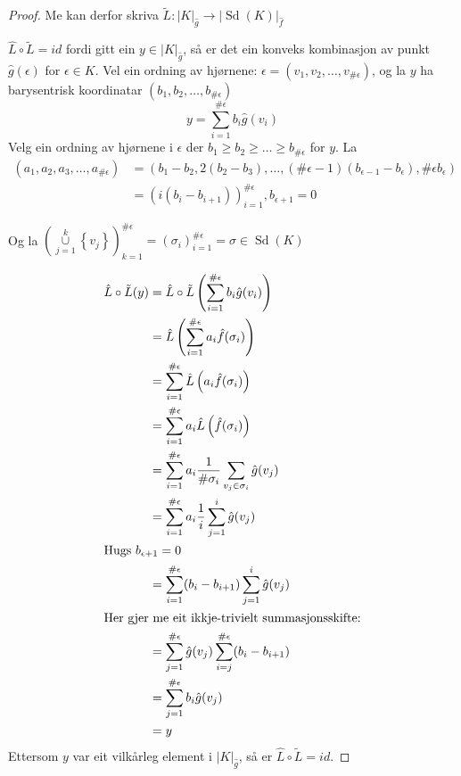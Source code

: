 \documentclass[a4paper, titlepage, 12pt, norsk]{article}
\theoremstyle{plain}
\theoremstyle{definition}
\newcommand{\union}{ \mathop{\cup}\limits }
\newcommand{\gr}[1]{ \lvert #1 \rvert } %
\newcommand{\set}[1]{ \left \{ #1 \right \} } %
\newcommand{\tuple}[1]{ \left( #1 \right) } %
\DeclareMathOperator{\Sd}{Sd}
\begin{document}
\begin{proof}
	Me kan derfor skriva \( \tilde{L}: \gr{K}_{\hat{g}} \to \gr{\Sd(K)}_{\hat{f}} \)

	\( \hat{L}\circ\tilde{L} = id \) fordi gitt ein \( y \in \gr{K}_{\hat{g}} \), så er det ein konveks kombinasjon av punkt \( \hat{g}(\epsilon) \) for \( \epsilon \in K \). Vel ein ordning av hjørnene: \( \epsilon = (v_1, v_2, \dots, v_{\#\epsilon}) \), og la \( y \) ha barysentrisk koordinatar \( (b_1, b_2, \dots, b_{\#\epsilon}) \)
	\[
		y = \sum_{i = 1}^{\#\epsilon} b_i \hat{g}(v_i)
	\]
	Velg ein ordning av hjørnene i \( \epsilon \) der \( b_1 \geq b_2 \geq \dots \geq b_{\#\epsilon} \) for \( y \). La 
	\begin{align*}
		(a_1, a_2, a_3, \dots, a_{\#\epsilon}) &= \left( b_1-b_2, 2(b_2-b_3), \dots, (\#\epsilon-1)(b_{\epsilon-1}-b_{\epsilon}), \#\epsilon b_{\epsilon} \right) \\
		&= \left( i (b_i-b_{i+1}) \right)_{i=1}^{\#\epsilon}, b_{\epsilon+1} = 0
	\end{align*}
		
	Og la \( \left(\union_{j = 1}^{k} \set{v_j} \right)_{k=1}^{\#\epsilon} = (\sigma_i)_{i=1}^{\#\epsilon}=\sigma \in \Sd(K) \)
	
	\begin{align*} %
		\hat{L}\circ\tilde{L}(y) &= \hat{L}\circ\tilde{L}\tuple{\sum_{i=1}^{\#\epsilon} b_i \hat{g}(v_i)} \\
		&= \hat{L}\left( \sum_{i=1}^{\#\epsilon} a_i \hat{f}(\sigma_i) \right) \\
		&= \sum_{i=1}^{\#\epsilon} \hat{L} \left( a_i \hat{f}(\sigma_i) \right) \\
		&= \sum_{i=1}^{\#\epsilon} a_i \hat{L} \left( \hat{f}(\sigma_i) \right) \\
		&= \sum_{i=1}^{\#\epsilon} a_i \frac{1}{\#\sigma_i} \sum_{v_j \in \sigma_i} \hat{g}(v_j) \\
		&= \sum_{i=1}^{\#\epsilon} a_i \frac{1}{i} \sum_{j = 1}^{i} \hat{g}(v_j) \\
		\intertext{Hugs \( b_{\epsilon+1} = 0 \)}
		&= \sum_{i=1}^{\#\epsilon} (b_{i}-b_{i+1}) \sum_{j = 1}^{i} \hat{g}(v_j) \\
		\intertext{Her gjer me eit ikkje-trivielt summasjonsskifte:}
		&= \sum_{j=1}^{\#\epsilon} \hat{g}(v_j) \sum_{i = j}^{\#\epsilon} (b_{i}-b_{i+1}) \\
		&= \sum_{j=1}^{\#\epsilon} b_i \hat{g}(v_j) \\
		&= y
	\end{align*}
	Ettersom \( y \) var eit vilkårleg element i \( \gr{K}_{\hat{g}} \), så er \( \hat{L}\circ\tilde{L} = id \).


\end{proof}
\end{document}
